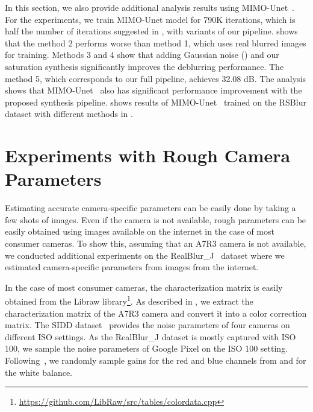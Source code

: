 In this section, we also provide additional analysis results using MIMO-Unet~\cite{Cho_2021_ICCV}. For the experiments, we train MIMO-Unet model for 790K iterations, which is half the number of iterations suggested in \cite{Cho_2021_ICCV}, with variants of our pipeline.
 shows that the method 2 performs worse than method 1, which uses real blurred images for training.
Methods 3 and 4 show that adding Gaussian noise () and our saturation synthesis significantly improves the deblurring performance.
The method 5, which corresponds to our full pipeline, achieves 32.08 dB.
The analysis shows that MIMO-Unet~\cite{Cho_2021_ICCV} also has significant performance improvement with the proposed synthesis pipeline.
 shows results of MIMO-Unet~\cite{Cho_2021_ICCV} trained on the RSBlur dataset with different methods in .

\section{Experiments with Rough Camera Parameters}

Estimating accurate camera-specific parameters can be easily done by taking a few shots of images.
Even if the camera is not available, rough parameters can be easily obtained using images available on the internet in the case of most consumer cameras.
To show this, assuming that an A7R3 camera is not available, we conducted additional experiments on the RealBlur\_J~\cite{jsrim-ECCV2020} dataset where we estimated camera-specific parameters from images from the internet.

In the case of most consumer cameras, the characterization matrix is easily obtained from the Libraw library\footnote{\href{https://github.com/LibRaw/LibRaw/blob/2a9a4de21ea7f5d15314da8ee5f27feebf239655/src/tables/colordata.cpp}{https://github.com/LibRaw/src/tables/colordata.cpp}}. As described in , we extract the characterization matrix of the A7R3 camera and convert it into a color correction matrix.
The SIDD dataset~\cite{Abdelhamed_2018_CVPR} provides the noise parameters of four cameras on different ISO settings. 
As the RealBlur\_J dataset is mostly captured with ISO 100, we sample the noise parameters of Google Pixel on the ISO 100 setting. 
Following~\cite{Brooks_2019_CVPR_denoising}, we randomly sample gains for the red and blue channels from  and  for the white balance.

